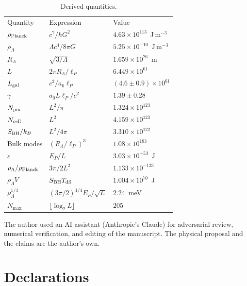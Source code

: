 \documentclass[aps,prd,twocolumn,superscriptaddress,nofootinbib,showkeys]{revtex4-2}
\begin{document}
\begin{table}[htbp]
\caption{Derived quantities.}
\label{tab:derived}
\begin{ruledtabular}
\begin{tabular}{lll}
Quantity & Expression & Value \\
\colrule
$\rho_{\rm Planck}$ & $c^7/\hbar G^2$ & $4.63\times10^{113}$~J\,m$^{-3}$ \\
$\rho_\Lambda$ & $\Lambda c^4/8\pi G$ & $5.25\times10^{-10}$~J\,m$^{-3}$ \\
$R_\Lambda$ & $\sqrt{3/\Lambda}$ & $1.659\times10^{26}$~m \\
$L$ & $2\pi R_\Lambda/\ell_P$ & $6.449\times10^{61}$ \\
$L_{\rm gal}$ & $c^2/a_0\ell_P$ & $(4.6\pm0.9)\times10^{61}$ \\
$\gamma$ & $a_0L\ell_P/c^2$ & $1.39\pm0.28$ \\
$N_{\rm pix}$ & $L^2/\pi$ & $1.324\times10^{123}$ \\
$N_{\rm cell}$ & $L^2$ & $4.159\times10^{123}$ \\
$S_{\rm BH}/k_B$ & $L^2/4\pi$ & $3.310\times10^{122}$ \\
Bulk modes & $(R_\Lambda/\ell_P)^3$ & $1.08\times10^{183}$ \\
$\varepsilon$ & $E_P/L$ & $3.03\times10^{-53}$~J \\
$\rho_\Lambda/\rho_{\rm Planck}$ & $3\pi/2L^2$ & $1.133\times10^{-123}$ \\
$\rho_\Lambda V$ & $S_{\rm BH}T_{\rm dS}$ & $1.004\times10^{70}$~J \\
$\rho_\Lambda^{1/4}$ & $(3\pi/2)^{1/4}E_P/\sqrt{L}$ & $2.24$~meV \\
$N_{\max}$ & $\lfloor\log_2 L\rfloor$ & $205$ \\
\end{tabular}
\end{ruledtabular}
\end{table}

\begin{acknowledgments}
The author used an AI assistant (Anthropic's Claude) for adversarial review, numerical verification, and editing of the manuscript. The physical proposal and the claims are the author's own.
\end{acknowledgments}

\section*{Declarations}
\end{document}
